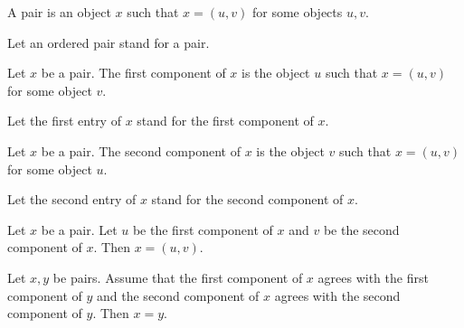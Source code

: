 \documentclass[../../set-theory.ftl.tex]{subfiles}
\begin{document}
\begin{forthel}
    \begin{definition}
      A pair is an object $x$ such that $x = (u,v)$ for some objects $u,v$.
    \end{definition}

    Let an ordered pair stand for a pair.

    \begin{definition}
      Let $x$ be a pair.
      The first component of $x$ is the object $u$ such that $x = (u,v)$ for some object $v$.
    \end{definition}

    Let the first entry of $x$ stand for the first component of $x$.

    \begin{definition}
      Let $x$ be a pair.
      The second component of $x$ is the object $v$ such that $x = (u,v)$ for some object $u$.
    \end{definition}

    Let the second entry of $x$ stand for the second component of $x$.

    \begin{lemma}\label{SetTheory_01_05_160632}
      Let $x$ be a pair.
      Let $u$ be the first component of $x$ and $v$ be the second component of $x$.
      Then $x = (u,v)$.
    \end{lemma}

    \begin{lemma}\label{SetTheory_01_05_204699}
      Let $x,y$ be pairs.
      Assume that the first component of $x$ agrees with the first component of $y$ and the second component of $x$ agrees with the second component of $y$.
      Then $x = y$.
    \end{lemma}
  \end{forthel}
\end{document}
